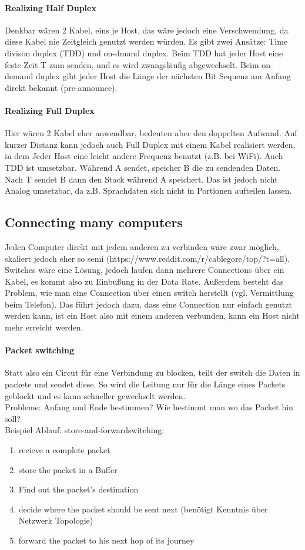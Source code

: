 		\paragraph{Realizing Half Duplex}
		Denkbar wären 2 Kabel, eins je Host, das wäre jedoch eine Verschwendung, da diese Kabel nie Zeitgleich genutzt werden würden. Es gibt zwei Ansätze: Time divison duplex (TDD) und on-dmand duplex. Beim TDD hat jeder Host eine feste Zeit T zum senden, und es wird zwangsläufig abgewechselt. Beim on-demand duplex gibt jeder Host die Länge der nächsten Bit Sequenz am Anfang direkt bekannt (pre-announce). 
	\paragraph{Realizing Full Duplex}
		Hier wären 2 Kabel eher anwendbar, bedeuten aber den doppelten Aufwand. Auf kurzer Distanz kann jedoch auch Full Duplex mit einem Kabel realisiert werden, in dem Jeder Host eine leicht andere Frequenz benutzt (z.B. bei WiFi). Auch TDD ist umsetzbar. Während A sendet, speicher B die zu sendenden Daten. Nach T sendet B dann den Stack während A speichert. Das ist jedoch nicht Analog umsetzbar, da z.B. Sprachdaten sich nicht in Portionen aufteilen lassen. 

\subsection{Connecting many computers}
	Jeden Computer direkt mit jedem anderen zu verbinden wäre zwar möglich, skaliert jedoch eher so semi (https://www.reddit.com/r/cablegore/top/?t=all). Switches wäre eine Lösung, jedoch laufen dann mehrere Connections über ein Kabel, es kommt also zu Einbußung in der Data Rate. Außerdem besteht das Problem, wie man eine Connection über einen switch herstellt (vgl. Vermittlung beim Telefon). Das führt jedoch dazu, dass eine Connection nur einfach genutzt werden kann, ist ein Host also mit einem anderen verbunden, kann ein Host nicht mehr erreicht werden. 
	\paragraph{Packet switching}
		Statt also ein Circut für eine Verbindung zu blocken, teilt der switch die Daten in packete und sendet diese. So wird die Leitung nur für die Länge eines Packets geblockt und es kann schneller gewechselt werden. \\
		Probleme: Anfang und Ende bestimmen? Wie bestimmt man wo das Packet hin soll? \\ Beispiel Ablauf: \frQuo store-and-forward\frQuc switching: 
		\begin{enumerate}
			\item recieve a complete packet
			\item store the packet in a Buffer
			\item Find out the packet's destination
			\item decide where the packet should be sent next (benötigt Kenntnis über Netzwerk Topologie)
			\item forward the packet to his next hop of its journey
		\end{enumerate}
